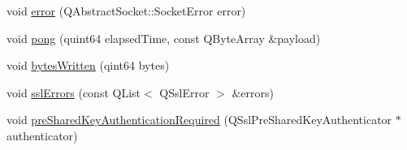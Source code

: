 \begin{DoxyCompactItemize}
\item 
void \mbox{\hyperlink{class_q_web_socket_a2c8b42c52eef7982f50dd1131b3133f6}{error}} (Q\+Abstract\+Socket\+::\+Socket\+Error error)
\item 
void \mbox{\hyperlink{class_q_web_socket_a8de4b00bd909961bfc5179d2859c4d65}{pong}} (quint64 elapsed\+Time, const Q\+Byte\+Array \&payload)
\item 
void \mbox{\hyperlink{class_q_web_socket_ad4be1036cba153baa4a7a7c2bfa3fe91}{bytes\+Written}} (qint64 bytes)
\item 
void \mbox{\hyperlink{class_q_web_socket_ae0d3eebd5b595e4e869d2ad6cef45ed7}{ssl\+Errors}} (const Q\+List$<$ Q\+Ssl\+Error $>$ \&errors)
\item 
void \mbox{\hyperlink{class_q_web_socket_ab12bc04c9c86d4b76238d8f3a25dcfa1}{pre\+Shared\+Key\+Authentication\+Required}} (Q\+Ssl\+Pre\+Shared\+Key\+Authenticator $\ast$authenticator)
\end{DoxyCompactItemize}
